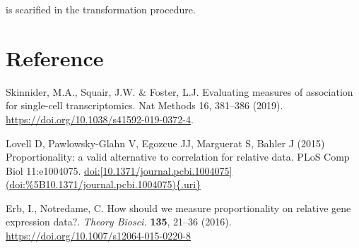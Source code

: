 \documentclass[
]{article}
\begin{document}
is scarified in the transformation procedure.

\hypertarget{reference}{%
\section{Reference}\label{reference}}

Skinnider, M.A., Squair, J.W. \& Foster, L.J. Evaluating measures of
association for single-cell transcriptomics. Nat Methods 16, 381--386
(2019). \url{https://doi.org/10.1038/s41592-019-0372-4}.

Lovell D, Pawlowsky-Glahn V, Egozcue JJ, Marguerat S, Bahler J (2015)
Proportionality: a valid alternative to correlation for relative data.
PLoS Comp Biol 11:e1004075.
\href{https://doi.org/10.1371/journal.pcbi.1004075}{doi:{[}10.1371/journal.pcbi.1004075{]}(doi:\%5B10.1371/journal.pcbi.1004075)\{.uri\}}

Erb, I., Notredame, C. How should we measure proportionality on relative
gene expression data?. \emph{Theory Biosci.} \textbf{135}, 21--36
(2016). \url{https://doi.org/10.1007/s12064-015-0220-8}
\end{document}
